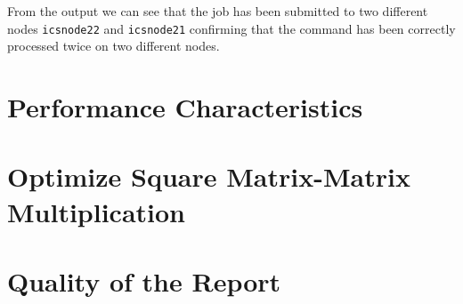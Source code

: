 \documentclass[unicode,11pt,a4paper,oneside,numbers=endperiod,openany]{scrartcl}
\begin{document}


From the output we can see that the job has been submitted to two different nodes \texttt{icsnode22} and \texttt{icsnode21} confirming that the command has been correctly processed twice on two different nodes.


\section{Performance Characteristics }


\section{Optimize Square Matrix-Matrix Multiplication  }


\section{Quality of the Report  }
\end{document}
